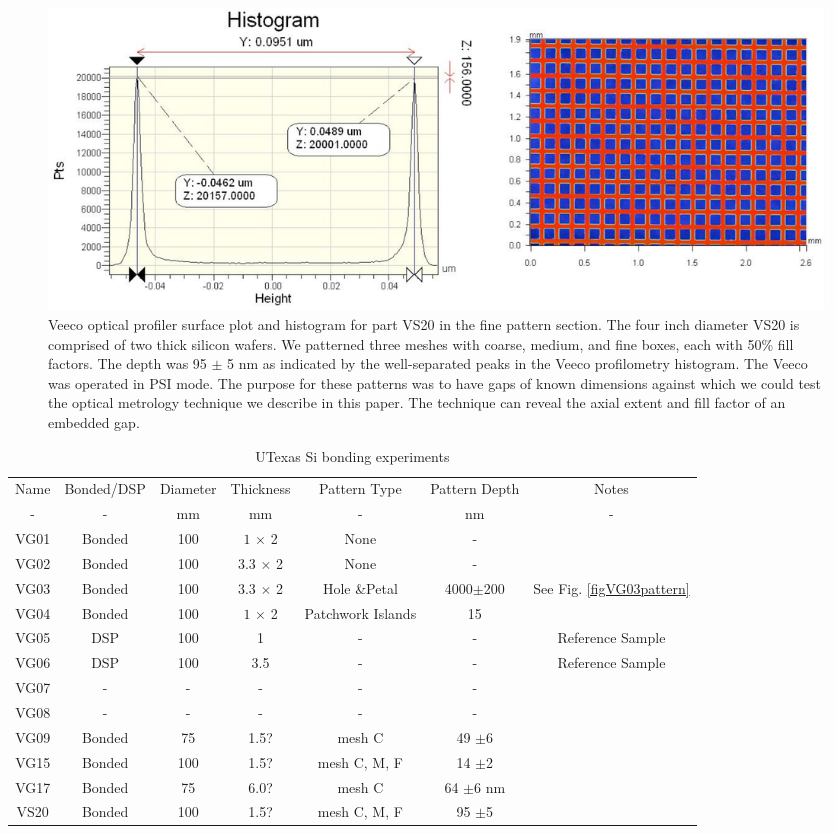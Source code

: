 \documentclass[osajnl,preprint,showpacs,superscriptaddress,12pt]{revtex4-1} %
\begin{document}
\begin{figure}[htbp]
\centerline{\includegraphics[width=1.0\columnwidth]{figs/VS20fineGapCrop.pdf}}
\caption{Veeco optical profiler surface plot and histogram for part VS20 in the fine pattern section\label{figVS20pattern}.  The four inch diameter VS20 is comprised of two thick silicon wafers.  We patterned three meshes with coarse, medium, and fine boxes, each with 50\% fill factors.  The depth was 95 $\pm$ 5 nm as indicated by the well-separated peaks in the Veeco profilometry histogram.  The Veeco was operated in PSI mode.  The purpose for these patterns was to have gaps of known dimensions against which we could test the optical metrology technique we describe in this paper.  The technique can reveal the axial extent and fill factor of an embedded gap.  }
\end{figure}


\begin{table}[h!]
\caption{UTexas Si bonding experiments \label{tabbondexper}}
\begin{center}
    \begin{tabular}{ c c c c c c c}
    \hline
    Name & Bonded/DSP & Diameter & Thickness & Pattern Type & Pattern Depth & Notes \\ 
    - & - & mm & mm & - & nm & - \\ 
        \hline
    VG01 & Bonded  & 100  &$1$ $\times$ 2 & None  & - &  \\
    VG02 & Bonded & 100 & $3.3$ $\times$ 2 &  None  & - &  \\
    VG03 & Bonded & 100 & $3.3$ $\times$ 2 &  Hole \&Petal & 4000$\pm$200 & See Fig. \ref{figVG03pattern}\\    
    VG04 & Bonded & 100 & $1$ $\times$ 2 &  Patchwork Islands & 15 & \\
    VG05 & DSP & 100 & 1&  - & - & Reference Sample  \\
    VG06 & DSP & 100 & 3.5 &  - & - & Reference Sample \\
    VG07 & - & - & - &  - & - & \\
    VG08 & - & - & - &  - & - & \\
    VG09 & Bonded & 75 & 1.5? & mesh C & 49 $\pm$6 & \\
    VG15 & Bonded & 100 & 1.5? &  mesh C, M, F  &14 $\pm$2 & \\
    VG17 & Bonded & 75 & 6.0? &  mesh C & 64 $\pm$6 nm & \\
    VS20 & Bonded & 100 & 1.5? &  mesh C, M, F & 95 $\pm$5 & \\
    \hline
    \end{tabular}
\end{center}
\end{table}
\end{document}
